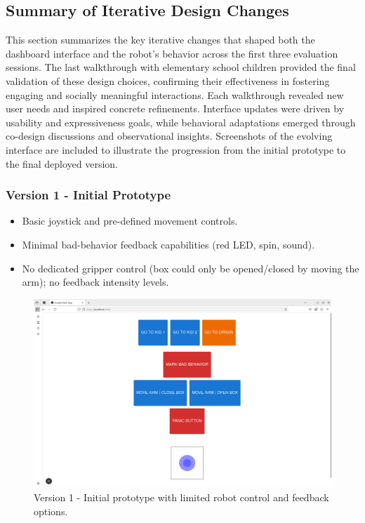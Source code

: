\documentclass[a4paper]{usiinfbachelorproject}
\begin{document}
\subsection{\textbf{Summary of Iterative Design Changes}}
This section summarizes the key iterative changes that shaped both the dashboard interface and the robot's behavior across the first three evaluation sessions.
The last walkthrough with elementary school children provided the final validation of these design choices, confirming their effectiveness in fostering engaging and socially meaningful interactions.
Each walkthrough revealed new user needs and inspired concrete refinements.
Interface updates were driven by usability and expressiveness goals, while behavioral adaptations emerged through co-design discussions and observational insights.
Screenshots of the evolving interface are included to illustrate the progression from the initial prototype to the final deployed version.

\subsubsection*{\textbf{Version 1 - Initial Prototype}}
\begin{itemize}
    \item Basic joystick and pre-defined movement controls.
    \item Minimal bad-behavior feedback capabilities (red LED, spin, sound).
    \item No dedicated gripper control (box could only be opened/closed by moving the arm); no feedback intensity levels.
\end{itemize}
\begin{figure}[H]
    \centering
    \includegraphics[width=0.8\linewidth]{figures/dashboard_v1.png}
    \caption{Version 1 - Initial prototype with limited robot control and feedback options.}
    \label{fig:dashboard-v1}
\end{figure}
\end{document}
